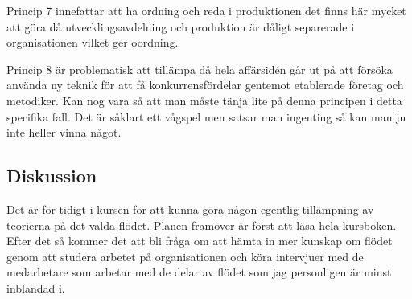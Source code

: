\documentclass{article}
\begin{document}
Princip 7 innefattar att ha ordning och reda i produktionen det finns här mycket att göra då utvecklingsavdelning och produktion är dåligt separerade i organisationen vilket ger oordning.

Princip 8 är problematisk att tillämpa då hela affärsidén går ut på att försöka använda ny teknik för att få konkurrensfördelar gentemot etablerade företag och metodiker. Kan nog vara så att man måste tänja lite på denna principen i detta specifika fall. Det är såklart ett vågspel men satsar man ingenting så kan man ju inte heller vinna något.

\subsection*{Diskussion}
Det är för tidigt i kursen för att kunna göra någon egentlig tillämpning av teorierna på det valda flödet. Planen framöver är först att läsa hela kursboken. Efter det så kommer det att bli fråga om att hämta in mer kunskap om flödet genom att studera arbetet på organisationen och köra intervjuer med de medarbetare som arbetar med de delar av flödet som jag personligen är minst inblandad i.
\end{document}

